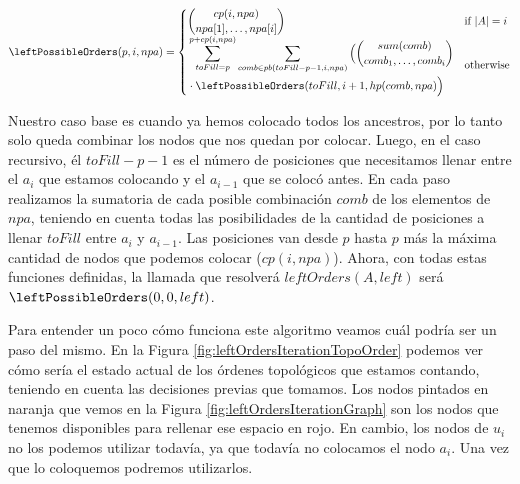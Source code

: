 
 \[
    \leftPossibleOrders(p,i,npa) = 
    \begin{cases} 
    \begin{aligned}
        \binom{ cp(i, npa)}{npa[1], \ldots, npa[i]} 
    \end{aligned} & \text{if $|A|=i$} \\
    \begin{aligned}
    &\sum_{toFill=p}^{p+cp(i,npa)} \sum_{comb \in pb(toFill-p-1,i, npa)} \Big(\binom{ sum(comb)}{comb_1, \ldots, comb_i} \\
    &  \cdot \leftPossibleOrders(toFill,i+1,hp(comb, npa)\Big)
    \end{aligned}
    & \text{otherwise}
    \end{cases}
\]


Nuestro caso base es cuando ya hemos colocado todos los ancestros, por lo tanto solo queda combinar los nodos que nos quedan por colocar. Luego, en el caso recursivo, él $toFill-p-1$ es el número de posiciones que necesitamos llenar entre el $a_i$ que estamos colocando y el $a_{i-1}$ que se colocó antes. En cada paso realizamos la sumatoria de cada posible combinación $comb$ de los elementos de $npa$, teniendo en cuenta todas las posibilidades de la cantidad de posiciones a llenar $toFill$ entre $a_i$ y $a_{i-1}$. Las posiciones van desde $p$ hasta $p$ más la máxima cantidad de nodos que podemos colocar ($cp(i,npa)$). Ahora, con todas estas funciones definidas, la llamada que resolverá $leftOrders(A, left)$ será $\leftPossibleOrders(0,0,left)$.

Para entender un poco cómo funciona este algoritmo veamos cuál podría ser un paso del mismo. En la Figura \ref{fig:leftOrdersIterationTopoOrder} podemos ver cómo sería el estado actual de los órdenes topológicos que estamos contando, teniendo en cuenta las decisiones previas que tomamos. Los nodos pintados en naranja que vemos en la Figura \ref{fig:leftOrdersIterationGraph} son los nodos que tenemos disponibles para rellenar ese espacio en rojo. En cambio, los nodos de $u_i$ no los podemos utilizar todavía, ya que todavía no colocamos el nodo $a_i$. Una vez que lo coloquemos podremos utilizarlos. 

